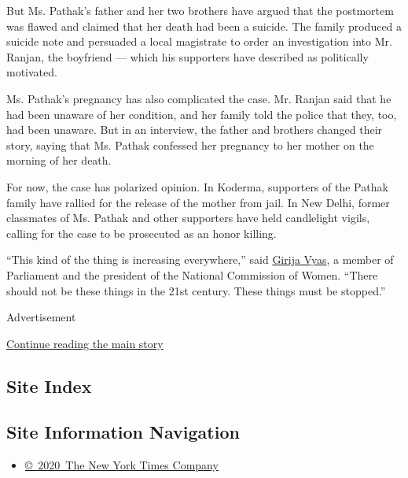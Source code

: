 But Ms. Pathak's father and her two brothers have argued that the
postmortem was flawed and claimed that her death had been a suicide. The
family produced a suicide note and persuaded a local magistrate to order
an investigation into Mr. Ranjan, the boyfriend --- which his supporters
have described as politically motivated.

Ms. Pathak's pregnancy has also complicated the case. Mr. Ranjan said
that he had been unaware of her condition, and her family told the
police that they, too, had been unaware. But in an interview, the father
and brothers changed their story, saying that Ms. Pathak confessed her
pregnancy to her mother on the morning of her death.

For now, the case has polarized opinion. In Koderma, supporters of the
Pathak family have rallied for the release of the mother from jail. In
New Delhi, former classmates of Ms. Pathak and other supporters have
held candlelight vigils, calling for the case to be prosecuted as an
honor killing.

``This kind of the thing is increasing everywhere,'' said
\href{http://india.gov.in/govt/loksabhampbiodata.php?mpcode=517}{Girija
Vyas}, a member of Parliament and the president of the National
Commission of Women. ``There should not be these things in the 21st
century. These things must be stopped.''

Advertisement

\protect\hyperlink{after-bottom}{Continue reading the main story}

\hypertarget{site-index}{%
\subsection{Site Index}\label{site-index}}

\hypertarget{site-information-navigation}{%
\subsection{Site Information
Navigation}\label{site-information-navigation}}

\begin{itemize}
\tightlist
\item
  \href{https://help.nytimes.com/hc/en-us/articles/115014792127-Copyright-notice}{©~2020~The
  New York Times Company}
\end{itemize}

